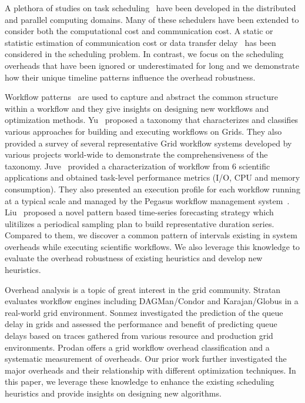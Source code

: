 A plethora of studies on task scheduling~\cite{Chetto1990, Dong2010, Yang03, Blythe2005} have been developed in the distributed and parallel computing domains. Many of these schedulers have been extended to consider both the computational cost and communication cost. A static or statistic estimation of communication cost or data transfer delay~\cite{Dong2010, Yang03} has been considered in the scheduling problem. In contrast, we focus on the scheduling overheads that have been ignored or underestimated for long and we demonstrate how their unique timeline patterns influence the overhead robustness. 

Workflow patterns~\cite{Yu2005, Juve2013, Liu2008} are used to capture and abstract the common structure within a workflow and they give insights on designing new workflows and optimization methods.  
Yu~\cite{Yu2005} proposed a taxonomy that characterizes and classifies various approaches for building and executing workflows on Grids. They also provided a survey of several representative Grid workflow systems developed by various projects world-wide to demonstrate the comprehensiveness of the taxonomy. Juve~\cite{Juve2013} provided a characterization of workflow from 6 scientific applications and obtained task-level performance metrics (I/O, CPU and memory consumption). They also presented an execution profile for each workflow running at a typical scale and managed by the Pegasus workflow management system~\cite{Deelman2005}. Liu~\cite{Liu2008} proposed a novel pattern based time-series forecasting strategy which ulitilizes a periodical sampling plan to build representative duration series. 
Compared to them, we discover a common pattern of intervals existing in system overheads while executing scientific workflows. We also leverage this knowledge to evaluate the overhead robustness of existing heuristics and develop new heuristics. 

Overhead analysis \cite{Prodan2008, Chen2011} is a topic of great interest in the grid community. Stratan \cite{Stratan2008} evaluates workflow engines including DAGMan/Condor and Karajan/Globus in a real-world grid environment. Sonmez \cite{Sonmez2006} investigated the prediction of the queue delay in grids and assessed the performance and benefit of predicting queue delays based on traces gathered from various resource and production grid environments. Prodan \cite{Prodan2008} offers a grid workflow overhead classification and a systematic measurement of overheads. Our prior work \cite{Chen2011} further investigated the major overheads and their relationship with different optimization techniques. 
In this paper, we leverage these knowledge to enhance the existing scheduling heuristics and provide insights on designing new algorithms. 


